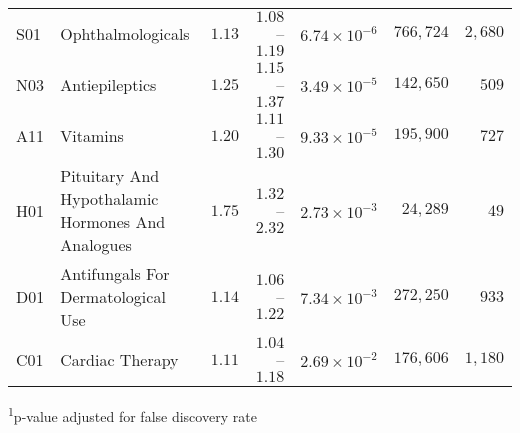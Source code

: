 \begin{longtable}{llrrrrr}
S01 & Ophthalmologicals & $1.13$ & $1.08$–$1.19$ & $6.74 \times 10^{-6}$ & $766,724$ & $2,680$ \\ 
N03 & Antiepileptics & $1.25$ & $1.15$–$1.37$ & $3.49 \times 10^{-5}$ & $142,650$ & $509$ \\ 
A11 & Vitamins & $1.20$ & $1.11$–$1.30$ & $9.33 \times 10^{-5}$ & $195,900$ & $727$ \\ 
H01 & Pituitary And Hypothalamic Hormones And Analogues & $1.75$ & $1.32$–$2.32$ & $2.73 \times 10^{-3}$ & $24,289$ & $49$ \\ 
D01 & Antifungals For Dermatological Use & $1.14$ & $1.06$–$1.22$ & $7.34 \times 10^{-3}$ & $272,250$ & $933$ \\ 
C01 & Cardiac Therapy & $1.11$ & $1.04$–$1.18$ & $2.69 \times 10^{-2}$ & $176,606$ & $1,180$ \\ 
 \bottomrule
\end{longtable}
\vspace{-5mm}
\begin{minipage}{\linewidth}
\textsuperscript{1}p-value adjusted for false discovery rate \\ 
\end{minipage}

